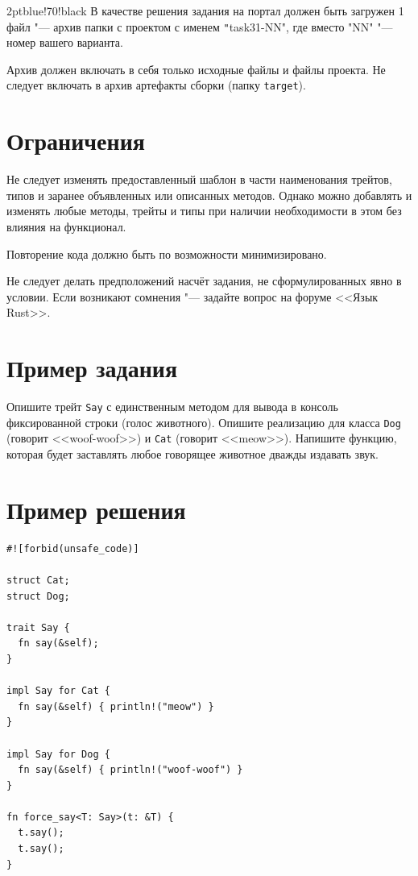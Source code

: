 \documentclass[a4paper, 10pt]{extarticle}
\begin{document}
\begin{awesomeblock}{2pt}{\faFile}{blue!70!black}
    В качестве решения задания на портал должен быть загружен 1 файл "--- архив папки с проектом с именем \texttt"task31-NN", где вместо \smlinline"NN" "--- номер вашего варианта.
    
    Архив должен включать в себя только исходные файлы и файлы проекта. Не следует включать в архив артефакты сборки (папку \verb|target|).
\end{awesomeblock}

\section{Ограничения}

\begin{importantblock}
    Не следует изменять предоставленный шаблон в части наименования трейтов, типов и заранее объявленных или описанных методов. Однако можно добавлять и изменять любые методы, трейты и типы при наличии необходимости в этом без влияния на функционал.
\end{importantblock}

\begin{importantblock}
    Повторение кода должно быть по возможности минимизировано.
\end{importantblock}

\begin{importantblock}
Не следует делать предположений насчёт задания, не сформулированных явно в условии. Если возникают сомнения "--- задайте вопрос на форуме <<Язык Rust>>.
\end{importantblock}


\section{Пример задания}

\begin{tsk}
    Опишите трейт \verb|Say| с единственным методом для вывода в консоль фиксированной строки (голос животного). Опишите реализацию для класса \verb|Dog| (говорит <<woof-woof>>) и \verb|Cat| (говорит <<meow>>). Напишите функцию, которая будет заставлять любое говорящее животное дважды издавать звук.
\end{tsk}

\section{Пример решения}
\begin{verbatim}
#![forbid(unsafe_code)]

struct Cat;
struct Dog;

trait Say {
  fn say(&self);
}

impl Say for Cat {
  fn say(&self) { println!("meow") }
}

impl Say for Dog {
  fn say(&self) { println!("woof-woof") }
}

fn force_say<T: Say>(t: &T) {
  t.say();
  t.say();
}
\end{verbatim}
\end{document}

